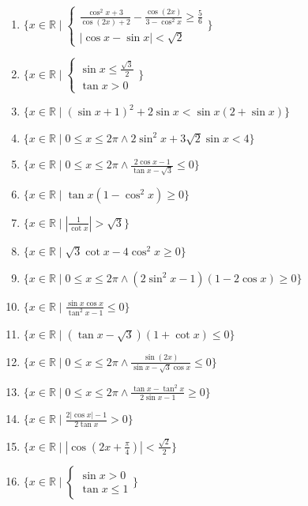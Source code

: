 \documentclass[11pt,a4paper]{article}
\begin{document}
\begin{enumerate}
\item $\displaystyle \{x \in \mathbb{R} \mid \begin{cases} \frac{\cos^{2} x + 3}{\cos\left(2x\right) + 2} - \frac{\cos\left(2x\right)}{3 - \cos^{2} x} \ge \frac{5}{6} \\ \left|\cos x - \sin x\right| < \sqrt{2} \end{cases}\}$
\item $\displaystyle \{x \in \mathbb{R} \mid \begin{cases} \sin x \le \frac{\sqrt{3}}{2} \\ \tan x > 0 \end{cases}\}$
\item $\displaystyle \{x \in \mathbb{R} \mid (\sin x + 1)^{2} + 2\sin x < \sin x(2 + \sin x)\}$
\item $\displaystyle \{x \in \mathbb{R} \mid 0 \le x \le 2\pi \land 2\sin^{2} x + 3\sqrt{2}\sin x < 4\}$
\item $\displaystyle \{x \in \mathbb{R} \mid 0 \le x \le 2\pi \land \frac{2\cos x - 1}{\tan x - \sqrt{3}} \le 0\}$
\item $\displaystyle \{x \in \mathbb{R} \mid \tan x(1 - \cos^{2} x) \ge 0\}$
\item $\displaystyle \{x \in \mathbb{R} \mid \left|\frac{1}{\cot x}\right| > \sqrt{3}\}$
\item $\displaystyle \{x \in \mathbb{R} \mid \sqrt{3}\cot x - 4\cos^{2} x \ge 0\}$
\item $\displaystyle \{x \in \mathbb{R} \mid 0 \le x \le 2\pi \land (2\sin^{2} x - 1)(1 - 2\cos x) \ge 0\}$
\item $\displaystyle \{x \in \mathbb{R} \mid \frac{\sin x \cos x}{\tan^{2} x - 1} \le 0\}$
\item $\displaystyle \{x \in \mathbb{R} \mid (\tan x - \sqrt{3})(1 + \cot x) \le 0\}$
\item $\displaystyle \{x \in \mathbb{R} \mid 0 \le x \le 2\pi \land \frac{\sin\left(2x\right)}{\sin x - \sqrt{3}\cos x} \le 0\}$
\item $\displaystyle \{x \in \mathbb{R} \mid 0 \le x \le 2\pi \land \frac{\tan x - \tan^{2} x}{2\sin x - 1} \ge 0\}$
\item $\displaystyle \{x \in \mathbb{R} \mid \frac{2\left|\cos x\right| - 1}{2\tan x} > 0\}$
\item $\displaystyle \{x \in \mathbb{R} \mid \left|\cos\left(2x + \frac{\pi}{4}\right)\right| < \frac{\sqrt{2}}{2}\}$
\item $\displaystyle \{x \in \mathbb{R} \mid \begin{cases} \sin x > 0 \\ \tan x \le 1 \end{cases}\}$

\end{enumerate}
\end{document}
